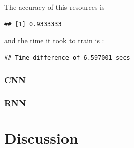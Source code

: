 \documentclass[6pt,letter]{article}\usepackage[]{graphicx}\usepackage[]{color}
\makeatletter
\newenvironment{kframe}{%
 \def\at@end@of@kframe{}%
 \ifinner\ifhmode%
  \def\at@end@of@kframe{\end{minipage}}%
  \begin{minipage}{\columnwidth}%
 \fi\fi%
 \def\FrameCommand##1{\hskip\@totalleftmargin \hskip-\fboxsep
 \colorbox{shadecolor}{##1}\hskip-\fboxsep
     \hskip-\linewidth \hskip-\@totalleftmargin \hskip\columnwidth}%
 \MakeFramed {\advance\hsize-\width
   \@totalleftmargin\z@ \linewidth\hsize
   \@setminipage}}%
 {\par\unskip\endMakeFramed%
 \at@end@of@kframe}
\newenvironment{knitrout}{}{} %
\makeatother
\begin{document}
The accuracy of this resources is
\begin{knitrout}
\color{fgcolor}\begin{kframe}
\begin{verbatim}
## [1] 0.9333333
\end{verbatim}
\end{kframe}
\end{knitrout}
and the time it took to train is :
\begin{knitrout}
\color{fgcolor}\begin{kframe}
\begin{verbatim}
## Time difference of 6.597001 secs
\end{verbatim}
\end{kframe}
\end{knitrout}
\subsubsection{CNN}
\subsubsection{RNN}

\section{Discussion}

\newpage
\pagestyle{plain}

\end{document}
